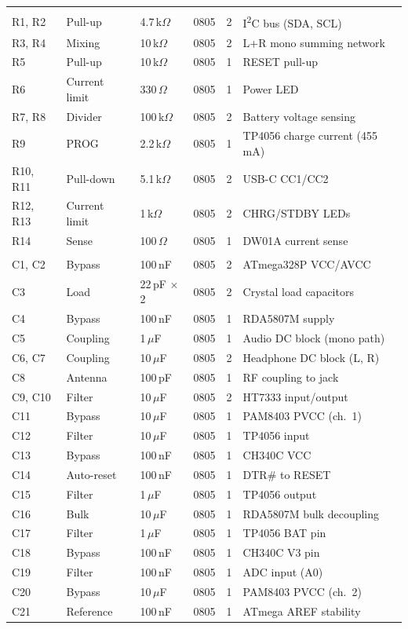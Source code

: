 \begin{longtable}{
  >{\ttfamily\small}l
  >{\raggedright\arraybackslash\small}p{3.2cm}
  >{\raggedright\arraybackslash\small}p{2.8cm}
  >{\small}c
  >{\small}c
  >{\raggedright\arraybackslash\small}p{3.8cm}
}
\rowcolor{tablehead!15}
\multicolumn{6}{l}{\textbf{\color{brandteal}Resistors}} \\
R1, R2 & Pull-up & 4.7\,k$\Omega$ & 0805 & 2 & I\textsuperscript{2}C bus (SDA, SCL) \\
R3, R4 & Mixing & 10\,k$\Omega$ & 0805 & 2 & L+R mono summing network \\
R5 & Pull-up & 10\,k$\Omega$ & 0805 & 1 & RESET pull-up \\
R6 & Current limit & 330\,$\Omega$ & 0805 & 1 & Power LED \\
R7, R8 & Divider & 100\,k$\Omega$ & 0805 & 2 & Battery voltage sensing \\
R9 & PROG & 2.2\,k$\Omega$ & 0805 & 1 & TP4056 charge current (455\,mA) \\
R10, R11 & Pull-down & 5.1\,k$\Omega$ & 0805 & 2 & USB-C CC1/CC2 \\
R12, R13 & Current limit & 1\,k$\Omega$ & 0805 & 2 & CHRG/STDBY LEDs \\
R14 & Sense & 100\,$\Omega$ & 0805 & 1 & DW01A current sense \\

\rowcolor{tablehead!15}
\multicolumn{6}{l}{\textbf{\color{brandteal}Capacitors}} \\
C1, C2 & Bypass & 100\,nF & 0805 & 2 & ATmega328P VCC/AVCC \\
C3 & Load & 22\,pF $\times$2 & 0805 & 2 & Crystal load capacitors \\
C4 & Bypass & 100\,nF & 0805 & 1 & RDA5807M supply \\
C5 & Coupling & 1\,$\mu$F & 0805 & 1 & Audio DC block (mono path) \\
C6, C7 & Coupling & 10\,$\mu$F & 0805 & 2 & Headphone DC block (L, R) \\
C8 & Antenna & 100\,pF & 0805 & 1 & RF coupling to jack \\
C9, C10 & Filter & 10\,$\mu$F & 0805 & 2 & HT7333 input/output \\
C11 & Bypass & 10\,$\mu$F & 0805 & 1 & PAM8403 PVCC (ch.~1) \\
C12 & Filter & 10\,$\mu$F & 0805 & 1 & TP4056 input \\
C13 & Bypass & 100\,nF & 0805 & 1 & CH340C VCC \\
C14 & Auto-reset & 100\,nF & 0805 & 1 & DTR\# to RESET \\
C15 & Filter & 1\,$\mu$F & 0805 & 1 & TP4056 output \\
C16 & Bulk & 10\,$\mu$F & 0805 & 1 & RDA5807M bulk decoupling \\
C17 & Filter & 1\,$\mu$F & 0805 & 1 & TP4056 BAT pin \\
C18 & Bypass & 100\,nF & 0805 & 1 & CH340C V3 pin \\
C19 & Filter & 100\,nF & 0805 & 1 & ADC input (A0) \\
C20 & Bypass & 10\,$\mu$F & 0805 & 1 & PAM8403 PVCC (ch.~2) \\
C21 & Reference & 100\,nF & 0805 & 1 & ATmega AREF stability \\


\end{longtable}
